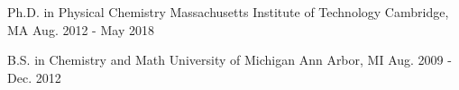

\begin{cventries}

  \cventry
    {Ph.D. in Physical Chemistry} %
    {Massachusetts Institute of Technology} %
    {Cambridge, MA} %
    {Aug. 2012 - May 2018} %
    {}
    
  \cventry
    {B.S. in Chemistry and Math} %
    {University of Michigan} %
    {Ann Arbor, MI} %
    {Aug. 2009 - Dec. 2012} %
    {}

\end{cventries}
